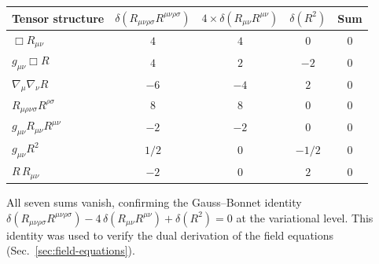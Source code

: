 \documentclass[12pt,a4paper]{article}
\newcommand{\Ricsq}{R_{\mu\nu}R^{\mu\nu}}
\newcommand{\Riemsq}{R_{\mu\nu\rho\sigma}R^{\mu\nu\rho\sigma}}
\theoremstyle{plain}
\theoremstyle{definition}
\begin{document}
\begin{center}
\begin{tabular}{lcccc}
\toprule
Tensor structure & $\delta(\Riemsq)$ & $4\times\delta(\Ricsq)$
  & $\delta(R^2)$ & Sum \\
\midrule
$\Box R_{\mu\nu}$ & $4$ & $4$ & $0$ & $0$ \\
$g_{\mu\nu}\Box R$ & $4$ & $2$ & $-2$ & $0$ \\
$\nabla_\mu\nabla_\nu R$ & $-6$ & $-4$ & $2$ & $0$ \\
$R_{\mu\rho\nu\sigma}R^{\rho\sigma}$ & $8$ & $8$ & $0$ & $0$ \\
$g_{\mu\nu}\Ricsq$ & $-2$ & $-2$ & $0$ & $0$ \\
$g_{\mu\nu}R^2$ & $1/2$ & $0$ & $-1/2$ & $0$ \\
$R\,R_{\mu\nu}$ & $-2$ & $0$ & $2$ & $0$ \\
\bottomrule
\end{tabular}
\end{center}

\noindent
All seven sums vanish, confirming the Gauss--Bonnet identity
$\delta(\Riemsq) - 4\,\delta(\Ricsq) + \delta(R^2) = 0$ at the
variational level.  This identity was used to verify the dual derivation
of the field equations (Sec.~\ref{sec:field-equations}).



\end{document}
